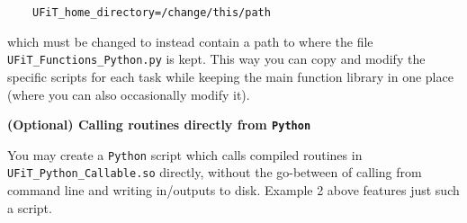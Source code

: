 \documentclass[12pt,twoside]{article}
\begin{document}
$\quad\quad$\texttt{UFiT\_home\_directory=\textquotesingle /change/this/path\textquotesingle }

which must be changed to instead contain a path to where the file \texttt{UFiT\_Functions\_Python.py} is kept. This way you can copy and modify the specific scripts for each task while keeping the main function library in one place (where you can also occasionally modify it).


\vspace{2mm}
{\large \textbf{(Optional) Calling routines directly from \texttt{Python}}}

You may create a \texttt{Python} script which calls compiled routines in \texttt{UFiT\_Python\_Callable.so} directly, without the go-between of calling from command line and writing in/outputs to disk. Example 2 above features just such a script.
\end{document}
